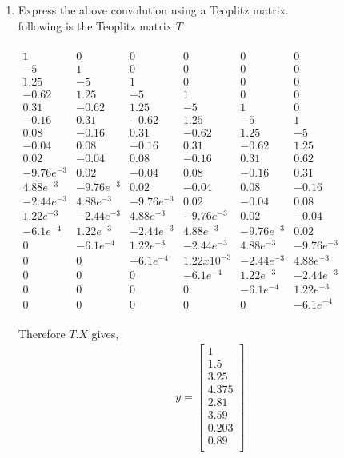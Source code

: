 \documentclass[journal,12pt,twocolumn]{IEEEtran}
\renewcommand\thesection{\arabic{section}}
\begin{document}
\begin{enumerate}[label=\thesection.\arabic*]
\item Express the above convolution using a Teoplitz matrix.\\
\solution following is the Teoplitz matrix $T$ \\ \\
$\begin{smallmatrix}
1 & 0 & 0 & 0 & 0 & 0\\
-5 & 1 & 0 & 0 & 0 & 0\\
1.25 &-5 & 1 & 0 & 0 & 0\\
-0.62 & 1.25 & -5 & 1 & 0 & 0\\
0.31 & -0.62 & 1.25 & -5 & 1 & 0\\
-0.16 & 0.31 & -0.62 & 1.25 & -5 & 1\\
0.08 & -0.16 & 0.31 & -0.62 & 1.25 & -5\\
-0.04 & 0.08 & -0.16 & 0.31 & -0.62 & 1.25\\
0.02 & -0.04 & 0.08 & -0.16 & 0.31 & 0.62\\
-9.76e^{-3} & 0.02 & -0.04 & 0.08 & -0.16 & 0.31 \\
4.88e^{-3} & -9.76e^{-3} & 0.02 & -0.04 & 0.08 & -0.16\\
-2.44e^{-3} & 4.88e^{-3} & -9.76e^{-3} & 0.02 & -0.04 & 0.08\\
1.22e^{-3} & -2.44e^{-3} & 4.88e^{-3} & -9.76e^{-3} & 0.02 & -0.04\\
-6.1e^{-4} & 1.22e^{-3} & -2.44e^{-3} & 4.88e^{-3} & -9.76e^{-3} & 0.02\\
0 & -6.1e^{-4} & 1.22e^{-3} & -2.44e^{-3} & 4.88e^{-3} & -9.76e^{-3}\\
0 & 0 & -6.1e^{-4} & 1.22x10^{-3} & -2.44e^{-3} & 4.88e^{-3}\\
0 & 0 & 0 & -6.1e^{-4} & 1.22e^{-3} & -2.44e^{-3}\\
0 & 0 & 0 & 0 & -6.1e^{-4} & 1.22e^{-3}\\
0 & 0 & 0 & 0 & 0 & -6.1e^{-4}
\end{smallmatrix}$ 
\\ \\
Therefore $T.X$ gives,
\begin{align}
y = 
\begin{bmatrix}
  1\\
  1.5 \\
  3.25\\
  4.375\\
  2.81 \\
  3.59 \\
  0.203 \\
  0.89\\

\end{bmatrix}
\end{align}
\end{enumerate}
\end{document}
